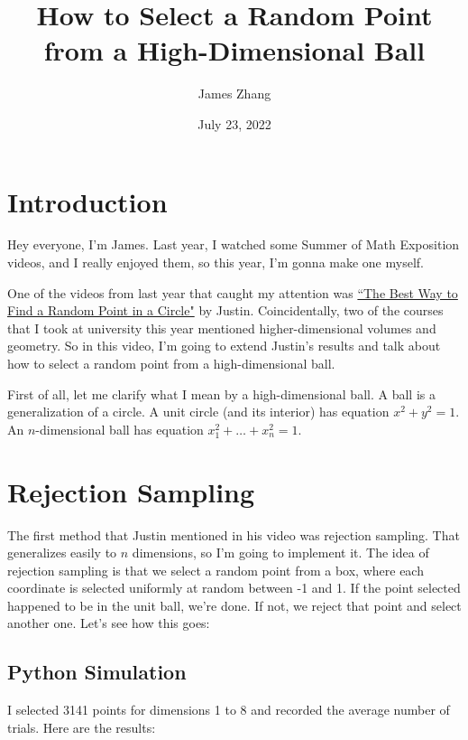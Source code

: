 \documentclass{article}
\title{How to Select a Random Point from a High-Dimensional Ball}
\author{James Zhang}
\date{July 23, 2022}
\begin{document}
\maketitle

\section{Introduction}

Hey everyone, I'm James. Last year, I watched some Summer of Math Exposition videos, and I really enjoyed them, so this year, I'm gonna make one myself.

One of the videos from last year that caught my attention was \href{https://www.youtube.com/watch?v=4y_nmpv-9lI&list=PLnQX-jgAF5pTkwtUuVpqS5tuWmJ-6ZM-Z&index=6&t=3s}{``The Best Way to Find a Random Point in a Circle"} by Justin. Coincidentally, two of the courses that I took at university this year mentioned higher-dimensional volumes and geometry. So in this video, I'm going to extend Justin's results and talk about how to select a random point from a high-dimensional ball.

First of all, let me clarify what I mean by a high-dimensional ball. A ball is a generalization of a circle. A unit circle (and its interior) has equation $x^2 + y^2 = 1$. An $n$-dimensional ball has equation $x_1^2 + \ldots + x_n^2 = 1$.

\section{Rejection Sampling}

The first method that Justin mentioned in his video was rejection sampling. That generalizes easily to $n$ dimensions, so I'm going to implement it. The idea of rejection sampling is that we select a random point from a box, where each coordinate is selected uniformly at random between -1 and 1. If the point selected happened to be in the unit ball, we're done. If not, we reject that point and select another one. Let's see how this goes:

\subsection{Python Simulation}

I selected 3141 points for dimensions 1 to 8 and recorded the average number of trials. Here are the results:

\end{document}
